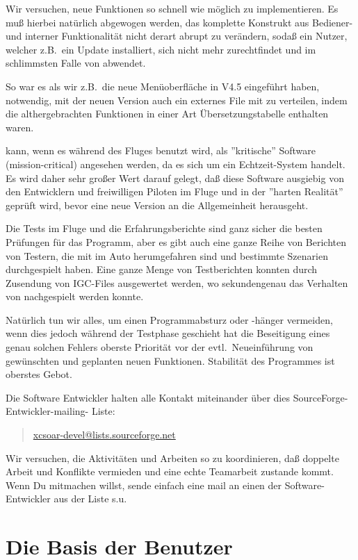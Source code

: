 Wir versuchen, neue Funktionen so schnell wie möglich zu implementieren. Es muß hierbei natürlich abgewogen werden, das komplette Konstrukt
aus Bediener- und interner Funktionalität nicht derart abrupt zu verändern, sodaß ein Nutzer, welcher z.B.\ ein Update installiert, sich nicht
mehr zurechtfindet und im schlimmsten Falle von \xc abwendet.

So war es als wir z.B.\ die neue Menüoberfläche in V4.5 eingeführt haben,  notwendig, mit der neuen Version  auch ein externes
File mit zu verteilen, indem die althergebrachten Funktionen in einer Art Übersetzungstabelle enthalten waren.

\xc kann, wenn es während des Fluges benutzt wird, als ''kritische'' Software  (mission-critical) angesehen werden, da es sich um ein Echtzeit-System handelt.
Es wird daher sehr großer Wert darauf gelegt, daß diese Software ausgiebig von den Entwicklern und  freiwilligen Piloten im Fluge und in der ''harten Realität'' geprüft wird,
bevor eine neue Version an die Allgemeinheit herausgeht.

Die Tests im Fluge und die Erfahrungsberichte sind ganz sicher die besten  Prüfungen für das Programm, aber es gibt auch eine ganze Reihe 
von Berichten von Testern, die mit \xc im Auto herumgefahren sind und bestimmte Szenarien durchgespielt haben.  Eine ganze Menge von 
Testberichten konnten durch Zusendung von  IGC-Files ausgewertet werden, wo sekundengenau das Verhalten von \xc nachgespielt werden konnte.

Natürlich tun wir alles, um einen Programmabsturz oder -hänger vermeiden, wenn dies jedoch während der Testphase geschieht hat die Beseitigung eines genau solchen 
Fehlers oberste Priorität vor der evtl.\  Neueinführung von gewünschten und geplanten neuen Funktionen.
Stabilität des Programmes ist oberstes Gebot.


Die Software Entwickler halten alle Kontakt miteinander über dies SourceForge-Entwickler-mailing- Liste:
\begin{quote}
\url{xcsoar-devel@lists.sourceforge.net}
\end{quote}
Wir versuchen, die Aktivitäten und Arbeiten so zu koordinieren, daß doppelte Arbeit und Konflikte vermieden 
und eine echte Teamarbeit zustande kommt. 
Wenn Du mitmachen willst, sende einfach eine mail an einen der Software-Entwickler aus der Liste s.u.\

\section{Die Basis der Benutzer}


